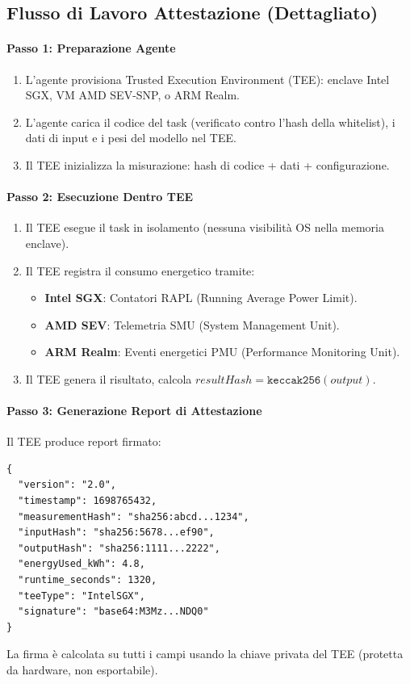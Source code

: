 \documentclass[11pt]{article}
\begin{document}
\begin{itemize}[noitemsep]
\subsection{Flusso di Lavoro Attestazione (Dettagliato)}
\label{sec:attestation-workflow}
\paragraph{Passo 1: Preparazione Agente}
\begin{enumerate}[noitemsep]
  \item L'agente provisiona Trusted Execution Environment (TEE): enclave Intel SGX, VM AMD SEV-SNP, o ARM Realm.
  \item L'agente carica il codice del task (verificato contro l'hash della whitelist), i dati di input e i pesi del modello nel TEE.
  \item Il TEE inizializza la misurazione: hash di codice + dati + configurazione.
\end{enumerate}

\paragraph{Passo 2: Esecuzione Dentro TEE}
\begin{enumerate}[noitemsep]
  \item Il TEE esegue il task in isolamento (nessuna visibilità OS nella memoria enclave).
  \item Il TEE registra il consumo energetico tramite:
    \begin{itemize}[noitemsep]
      \item \textbf{Intel SGX}: Contatori RAPL (Running Average Power Limit).
      \item \textbf{AMD SEV}: Telemetria SMU (System Management Unit).
      \item \textbf{ARM Realm}: Eventi energetici PMU (Performance Monitoring Unit).
    \end{itemize}
  \item Il TEE genera il risultato, calcola $resultHash = \texttt{keccak256}(output)$.
\end{enumerate}

\paragraph{Passo 3: Generazione Report di Attestazione}
Il TEE produce report firmato:
\begin{verbatim}
{
  "version": "2.0",
  "timestamp": 1698765432,
  "measurementHash": "sha256:abcd...1234",
  "inputHash": "sha256:5678...ef90",
  "outputHash": "sha256:1111...2222",
  "energyUsed_kWh": 4.8,
  "runtime_seconds": 1320,
  "teeType": "IntelSGX",
  "signature": "base64:M3Mz...NDQ0"
}
\end{verbatim}
La firma è calcolata su tutti i campi usando la chiave privata del TEE (protetta da hardware, non esportabile).


\end{itemize}
\end{document}
